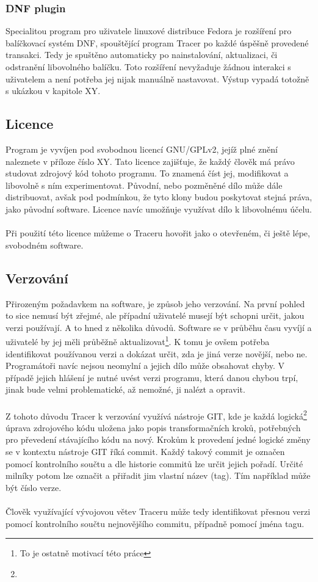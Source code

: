 \documentclass[
  field=inf,
  biblatex,
  glossaries,
  index
]{kidiplom}
\begin{document}
		\subsubsection{DNF plugin}
		Specialitou program pro uživatele linuxové distribuce Fedora je rozšíření pro balíčkovací systém DNF, spouštějící program Tracer po každé úspěšně provedené transakci. Tedy je spuštěno automaticky po nainstalování, aktualizaci, či odstranění libovolného balíčku. Toto rozšíření nevyžaduje žádnou interakci s uživatelem a není potřeba jej nijak manuálně nastavovat. Výstup vypadá totožně s ukázkou v kapitole XY.

	\subsection{Licence}
	Program je vyvíjen pod svobodnou licencí GNU/GPLv2, jejíž plné znění naleznete v příloze číslo XY\@. Tato licence zajišťuje, že každý člověk má právo studovat zdrojový kód tohoto programu. To znamená číst jej, modifikovat a libovolně s ním experimentovat. Původní, nebo pozměněné dílo může dále distribuovat, avšak pod podmínkou, že tyto klony budou poskytovat stejná práva, jako původní software. Licence navíc umožňuje využívat dílo k libovolnému účelu.
	\\
	\\
	Při použití této licence můžeme o Traceru hovořit jako o otevřeném, či ještě lépe, svobodném software.

	\subsection{Verzování}
	Přirozeným požadavkem na software, je  způsob jeho verzování. Na první pohled to sice nemusí být zřejmé, ale případní uživatelé musejí být schopni určit, jakou verzi používají. A to hned z několika důvodů. Software se v průběhu času vyvíjí a uživatelé by jej měli průběžně aktualizovat\footnote{To je ostatně motivací této práce}. K tomu je ovšem potřeba identifikovat používanou verzi a dokázat určit, zda je jiná verze novější, nebo ne. Programátoři navíc nejsou neomylní a jejich dílo může obsahovat chyby. V případě jejich hlášení je nutné uvést verzi programu, která danou chybou trpí, jinak bude velmi problematické, až nemožné, ji nalézt a opravit.
	\\
	\\
	Z tohoto důvodu Tracer k verzování využívá nástroje GIT, kde je každá logická\footnote{} úprava zdrojového kódu uložena jako popis transformačních kroků, potřebných pro převedení stávajícího kódu na nový. Krokům k provedení jedné logické změny se v kontextu nástroje GIT říká commit. Každý takový commit je označen pomocí kontrolního součtu a dle historie commitů lze určit jejich pořadí. Určité milníky potom lze označit a přiřadit jim vlastní název (tag). Tím například může být číslo verze.
	\\
	\\
	Člověk využívající vývojovou větev Traceru může tedy identifikovat přesnou verzi pomocí kontrolního součtu nejnovějšího commitu, případně pomocí jména tagu.
\end{document}
